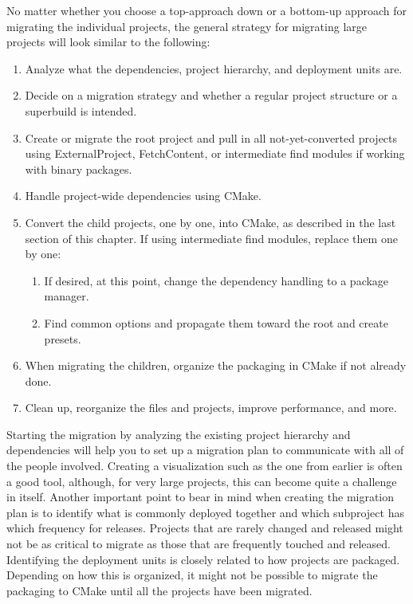 No matter whether you choose a top-approach down or a bottom-up approach for migrating the individual projects, the general strategy for migrating large projects will look similar to the following:

\begin{enumerate}
\item 
Analyze what the dependencies, project hierarchy, and deployment units are.

\item 
Decide on a migration strategy and whether a regular project structure or a superbuild is intended.

\item 
Create or migrate the root project and pull in all not-yet-converted projects using ExternalProject, FetchContent, or intermediate find modules if working with binary packages.

\item
Handle project-wide dependencies using CMake.

\item
Convert the child projects, one by one, into CMake, as described in the last section
of this chapter. If using intermediate find modules, replace them one by one:

\begin{enumerate}[label=\roman*]
\item
If desired, at this point, change the dependency handling to a package manager.

\item
Find common options and propagate them toward the root and create presets.
\end{enumerate}

\item
When migrating the children, organize the packaging in CMake if not already done.

\item
Clean up, reorganize the files and projects, improve performance, and more.
\end{enumerate}

Starting the migration by analyzing the existing project hierarchy and dependencies
will help you to set up a migration plan to communicate with all of the people involved.
Creating a visualization such as the one from earlier is often a good tool, although, for
very large projects, this can become quite a challenge in itself. Another important point to
bear in mind when creating the migration plan is to identify what is commonly deployed
together and which subproject has which frequency for releases. Projects that are rarely
changed and released might not be as critical to migrate as those that are frequently
touched and released. Identifying the deployment units is closely related to how projects
are packaged. Depending on how this is organized, it might not be possible to migrate the
packaging to CMake until all the projects have been migrated.

